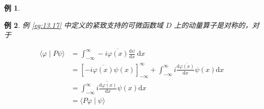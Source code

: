 \documentclass[hyperref,UTF8]{ctexbook}
\newtheorem{eg}{例}[chapter]
\begin{document}
\begin{eg}
    
\end{eg} 
\begin{eg}
    例 \ref{eg:13.17} 中定义的紧致支持的可微函数域 \(D\) 上的动量算子是对称的，对于

\begin{align*}
    \langle\varphi \mid P \psi\rangle&=\int_{-\infty}^{\infty}-i \overline{\varphi(x)} \frac{\mathrm{d} \psi}{\mathrm{d} x} \mathrm{~d} x\\
    &=[-i \overline{\varphi(x)} \psi(x)]_{-\infty}^{\infty}+\int_{-\infty}^{\infty} i \frac{\mathrm{d} \overline{\varphi(x)}}{\mathrm{d} x} \psi(x) \mathrm{d} x \\
&=\int_{-\infty}^{\infty} \overline{i \frac{\mathrm{d} \varphi(x)}{\mathrm{d} x}} \psi(x) \mathrm{d} x \\
&=\langle P \varphi \mid \psi\rangle
\end{align*}


\end{eg}
\end{document}
